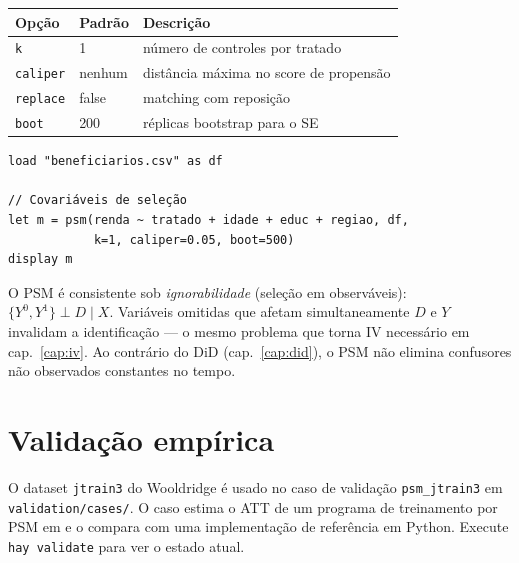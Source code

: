 \begin{center}
\begin{tabular}{lll}
\toprule
\textbf{Opção} & \textbf{Padrão} & \textbf{Descrição} \\
\midrule
\texttt{k}        & 1       & número de controles por tratado \\
\texttt{caliper}  & nenhum  & distância máxima no score de propensão \\
\texttt{replace}  & false   & matching com reposição \\
\texttt{boot}     & 200     & réplicas bootstrap para o SE \\
\bottomrule
\end{tabular}
\end{center}

\begin{lstlisting}[caption={Fluxo típico — avaliação de programa}]
load "beneficiarios.csv" as df

// Covariáveis de seleção
let m = psm(renda ~ tratado + idade + educ + regiao, df,
            k=1, caliper=0.05, boot=500)
display m
\end{lstlisting}

\begin{nota}
  O PSM é consistente sob \emph{ignorabilidade} (seleção em observáveis):
  $\{Y^0, Y^1\} \perp D \mid X$. Variáveis omitidas que afetam
  simultaneamente $D$ e $Y$ invalidam a identificação — o mesmo problema
  que torna IV necessário em cap.~\ref{cap:iv}. Ao contrário do DiD
  (cap.~\ref{cap:did}), o PSM não elimina confusores não observados
  constantes no tempo.
\end{nota}

\section{Validação empírica}

O dataset \texttt{jtrain3} do Wooldridge é usado no caso de validação
\texttt{psm_jtrain3} em \texttt{validation/cases/}. O caso estima o ATT de
um programa de treinamento por PSM em \hayashi{} e o compara com uma
implementação de referência em Python. Execute \lstinline{hay validate} para
ver o estado atual.
